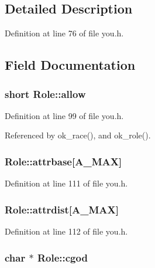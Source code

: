 \subsection{Detailed Description}


Definition at line 76 of file you.\+h.



\subsection{Field Documentation}
\hypertarget{structRole_a971fdc715375fa65fd70999351fbbadc}{
\subsubsection[{allow}]{\setlength{\rightskip}{0pt plus 5cm}short Role\+::allow}}\label{structRole_a971fdc715375fa65fd70999351fbbadc}


Definition at line 99 of file you.\+h.



Referenced by ok\+\_\+race(), and ok\+\_\+role().

\hypertarget{structRole_ac28153e1a38eb9abf7a02a37b8fabe6d}{
\subsubsection[{attrbase}]{ Role\+::attrbase\mbox{[}{\bf A\+\_\+\+M\+A\+X}\mbox{]}}}\label{structRole_ac28153e1a38eb9abf7a02a37b8fabe6d}


Definition at line 111 of file you.\+h.

\hypertarget{structRole_a4c4ea3098e99e939a3a296ae86fca9f1}{
\subsubsection[{attrdist}]{ Role\+::attrdist\mbox{[}{\bf A\+\_\+\+M\+A\+X}\mbox{]}}}\label{structRole_a4c4ea3098e99e939a3a296ae86fca9f1}


Definition at line 112 of file you.\+h.

\hypertarget{structRole_a72dc55eac27db8d205b94bcb35c708fd}{
\subsubsection[{cgod}]{ char $\ast$ Role\+::cgod}}\label{structRole_a72dc55eac27db8d205b94bcb35c708fd}


